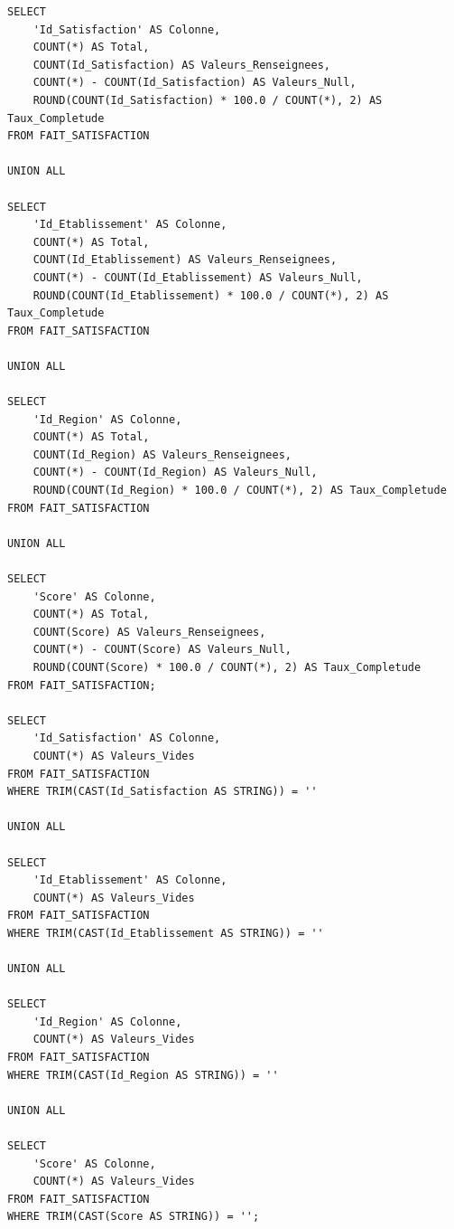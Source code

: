 \begin{verbatim}
SELECT
    'Id_Satisfaction' AS Colonne,
    COUNT(*) AS Total,
    COUNT(Id_Satisfaction) AS Valeurs_Renseignees,
    COUNT(*) - COUNT(Id_Satisfaction) AS Valeurs_Null,
    ROUND(COUNT(Id_Satisfaction) * 100.0 / COUNT(*), 2) AS Taux_Completude
FROM FAIT_SATISFACTION

UNION ALL

SELECT
    'Id_Etablissement' AS Colonne,
    COUNT(*) AS Total,
    COUNT(Id_Etablissement) AS Valeurs_Renseignees,
    COUNT(*) - COUNT(Id_Etablissement) AS Valeurs_Null,
    ROUND(COUNT(Id_Etablissement) * 100.0 / COUNT(*), 2) AS Taux_Completude
FROM FAIT_SATISFACTION

UNION ALL

SELECT
    'Id_Region' AS Colonne,
    COUNT(*) AS Total,
    COUNT(Id_Region) AS Valeurs_Renseignees,
    COUNT(*) - COUNT(Id_Region) AS Valeurs_Null,
    ROUND(COUNT(Id_Region) * 100.0 / COUNT(*), 2) AS Taux_Completude
FROM FAIT_SATISFACTION

UNION ALL

SELECT
    'Score' AS Colonne,
    COUNT(*) AS Total,
    COUNT(Score) AS Valeurs_Renseignees,
    COUNT(*) - COUNT(Score) AS Valeurs_Null,
    ROUND(COUNT(Score) * 100.0 / COUNT(*), 2) AS Taux_Completude
FROM FAIT_SATISFACTION;

SELECT
    'Id_Satisfaction' AS Colonne,
    COUNT(*) AS Valeurs_Vides
FROM FAIT_SATISFACTION
WHERE TRIM(CAST(Id_Satisfaction AS STRING)) = ''

UNION ALL

SELECT
    'Id_Etablissement' AS Colonne,
    COUNT(*) AS Valeurs_Vides
FROM FAIT_SATISFACTION
WHERE TRIM(CAST(Id_Etablissement AS STRING)) = ''

UNION ALL

SELECT
    'Id_Region' AS Colonne,
    COUNT(*) AS Valeurs_Vides
FROM FAIT_SATISFACTION
WHERE TRIM(CAST(Id_Region AS STRING)) = ''

UNION ALL

SELECT
    'Score' AS Colonne,
    COUNT(*) AS Valeurs_Vides
FROM FAIT_SATISFACTION
WHERE TRIM(CAST(Score AS STRING)) = '';
\end{verbatim}
